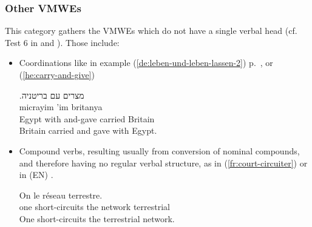 \documentclass[output=paper,
modfonts,
]{langscibook}
\begin{document}
\subsubsection{Other VMWEs}
\label{sec:oth}
%
This category gathers the VMWEs which do not have a single verbal head (cf. Test 6 in  and ). Those include:
\begin{itemize}
\item Coordinations like in example (\ref{de:leben-und-leben-lassen-2}) p.~\pageref{de:leben-und-leben-lassen-2}, or (\ref{he:carry-and-give})


\ea \label{he:carry-and-give}
\settowidth {}
\glll .\textup{מצרים} \textup{עם}   \textup{בריטניה} \\
micrayim 'im   britanya \\ 
Egypt with and-gave carried Britain\\ 
\glt Britain carried and gave with Egypt. 
\z

\item Compound verbs, resulting usually from conversion of nominal com\-po\-unds, and therefore having no regular verbal structure, as in (\ref{fr:court-circuiter}) or in 
(EN) . 


\ea \label{fr:court-circuiter}
\settowidth {}
\gll On  le réseau terrestre. \\
one short-circuits the network terrestrial \\ 
\glt One short-circuits the terrestrial network. 
\z

\end{itemize}
\end{document}
